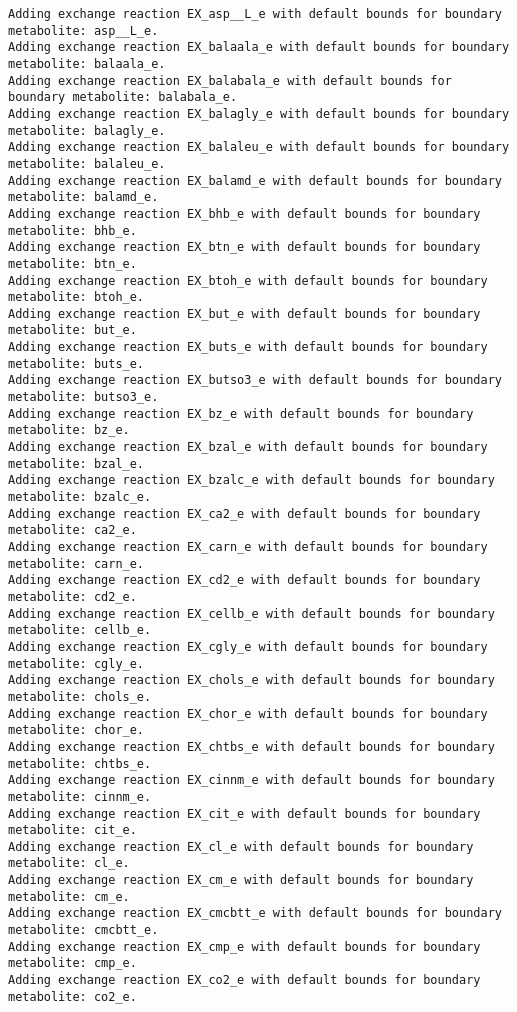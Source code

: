\documentclass[
  letterpaper,
  DIV=11,
  numbers=noendperiod]{scrartcl}
\begin{document}
\begin{verbatim}
Adding exchange reaction EX_asp__L_e with default bounds for boundary metabolite: asp__L_e.
Adding exchange reaction EX_balaala_e with default bounds for boundary metabolite: balaala_e.
Adding exchange reaction EX_balabala_e with default bounds for boundary metabolite: balabala_e.
Adding exchange reaction EX_balagly_e with default bounds for boundary metabolite: balagly_e.
Adding exchange reaction EX_balaleu_e with default bounds for boundary metabolite: balaleu_e.
Adding exchange reaction EX_balamd_e with default bounds for boundary metabolite: balamd_e.
Adding exchange reaction EX_bhb_e with default bounds for boundary metabolite: bhb_e.
Adding exchange reaction EX_btn_e with default bounds for boundary metabolite: btn_e.
Adding exchange reaction EX_btoh_e with default bounds for boundary metabolite: btoh_e.
Adding exchange reaction EX_but_e with default bounds for boundary metabolite: but_e.
Adding exchange reaction EX_buts_e with default bounds for boundary metabolite: buts_e.
Adding exchange reaction EX_butso3_e with default bounds for boundary metabolite: butso3_e.
Adding exchange reaction EX_bz_e with default bounds for boundary metabolite: bz_e.
Adding exchange reaction EX_bzal_e with default bounds for boundary metabolite: bzal_e.
Adding exchange reaction EX_bzalc_e with default bounds for boundary metabolite: bzalc_e.
Adding exchange reaction EX_ca2_e with default bounds for boundary metabolite: ca2_e.
Adding exchange reaction EX_carn_e with default bounds for boundary metabolite: carn_e.
Adding exchange reaction EX_cd2_e with default bounds for boundary metabolite: cd2_e.
Adding exchange reaction EX_cellb_e with default bounds for boundary metabolite: cellb_e.
Adding exchange reaction EX_cgly_e with default bounds for boundary metabolite: cgly_e.
Adding exchange reaction EX_chols_e with default bounds for boundary metabolite: chols_e.
Adding exchange reaction EX_chor_e with default bounds for boundary metabolite: chor_e.
Adding exchange reaction EX_chtbs_e with default bounds for boundary metabolite: chtbs_e.
Adding exchange reaction EX_cinnm_e with default bounds for boundary metabolite: cinnm_e.
Adding exchange reaction EX_cit_e with default bounds for boundary metabolite: cit_e.
Adding exchange reaction EX_cl_e with default bounds for boundary metabolite: cl_e.
Adding exchange reaction EX_cm_e with default bounds for boundary metabolite: cm_e.
Adding exchange reaction EX_cmcbtt_e with default bounds for boundary metabolite: cmcbtt_e.
Adding exchange reaction EX_cmp_e with default bounds for boundary metabolite: cmp_e.
Adding exchange reaction EX_co2_e with default bounds for boundary metabolite: co2_e.

\end{verbatim}
\end{document}
